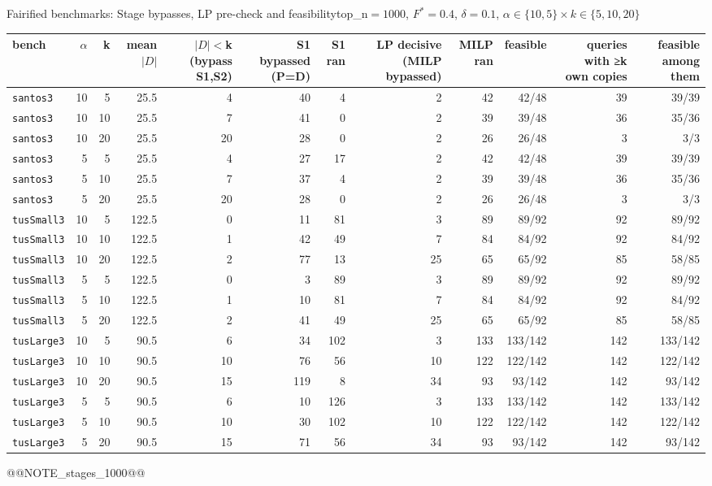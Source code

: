 \begin{frame}{Fairified benchmarks: Stage bypasses, LP pre-check and feasibility}{top\_n$=1000$, $F^*{=}0.4$, $\delta{=}0.1$, $\alpha\in\{10,5\}\times k\in\{5,10,20\}$}
\tiny
\begin{center}
\setlength{\tabcolsep}{2.5pt}
\begin{tabular}{lrrrrrrrrrrr}
\toprule
bench & $\alpha$ & k & mean $|D|$ & $|D|$$<$k (bypass S1,S2) & S1 bypassed (P=D) & S1 ran & LP decisive (MILP bypassed) & MILP ran & feasible & queries with ≥k own copies & feasible among them \\
\midrule
\texttt{santos3} & 10 & 5 & 25.5 & 4 & 40 & 4 & 2 & 42 & 42/48 & 39 & 39/39 \\
\texttt{santos3} & 10 & 10 & 25.5 & 7 & 41 & 0 & 2 & 39 & 39/48 & 36 & 35/36 \\
\texttt{santos3} & 10 & 20 & 25.5 & 20 & 28 & 0 & 2 & 26 & 26/48 & 3 & 3/3 \\
\texttt{santos3} & 5 & 5 & 25.5 & 4 & 27 & 17 & 2 & 42 & 42/48 & 39 & 39/39 \\
\texttt{santos3} & 5 & 10 & 25.5 & 7 & 37 & 4 & 2 & 39 & 39/48 & 36 & 35/36 \\
\texttt{santos3} & 5 & 20 & 25.5 & 20 & 28 & 0 & 2 & 26 & 26/48 & 3 & 3/3 \\
\texttt{tusSmall3} & 10 & 5 & 122.5 & 0 & 11 & 81 & 3 & 89 & 89/92 & 92 & 89/92 \\
\texttt{tusSmall3} & 10 & 10 & 122.5 & 1 & 42 & 49 & 7 & 84 & 84/92 & 92 & 84/92 \\
\texttt{tusSmall3} & 10 & 20 & 122.5 & 2 & 77 & 13 & 25 & 65 & 65/92 & 85 & 58/85 \\
\texttt{tusSmall3} & 5 & 5 & 122.5 & 0 & 3 & 89 & 3 & 89 & 89/92 & 92 & 89/92 \\
\texttt{tusSmall3} & 5 & 10 & 122.5 & 1 & 10 & 81 & 7 & 84 & 84/92 & 92 & 84/92 \\
\texttt{tusSmall3} & 5 & 20 & 122.5 & 2 & 41 & 49 & 25 & 65 & 65/92 & 85 & 58/85 \\
\texttt{tusLarge3} & 10 & 5 & 90.5 & 6 & 34 & 102 & 3 & 133 & 133/142 & 142 & 133/142 \\
\texttt{tusLarge3} & 10 & 10 & 90.5 & 10 & 76 & 56 & 10 & 122 & 122/142 & 142 & 122/142 \\
\texttt{tusLarge3} & 10 & 20 & 90.5 & 15 & 119 & 8 & 34 & 93 & 93/142 & 142 & 93/142 \\
\texttt{tusLarge3} & 5 & 5 & 90.5 & 6 & 10 & 126 & 3 & 133 & 133/142 & 142 & 133/142 \\
\texttt{tusLarge3} & 5 & 10 & 90.5 & 10 & 30 & 102 & 10 & 122 & 122/142 & 142 & 122/142 \\
\texttt{tusLarge3} & 5 & 20 & 90.5 & 15 & 71 & 56 & 34 & 93 & 93/142 & 142 & 93/142 \\
\bottomrule
\end{tabular}
\end{center}
@@NOTE_stages_1000@@
\end{frame}

